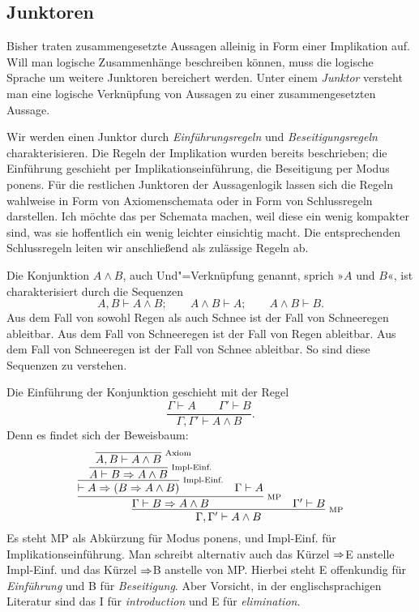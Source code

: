 \subsection{Junktoren}

Bisher traten zusammengesetzte Aussagen alleinig in Form einer
Implikation auf. Will man logische Zusammenhänge beschreiben können,
muss die logische Sprache um weitere Junktoren bereichert werden.
Unter einem \emph{Junktor} versteht man eine logische
Verknüpfung von Aussagen zu einer zusammengesetzten Aussage.

Wir werden einen Junktor durch \emph{Einführungsregeln}%
 und
\emph{Beseitigungsregeln}
charakterisieren. Die Regeln der Implikation
wurden bereits beschrieben; die Einführung geschieht per
Implikationseinführung, die Beseitigung per Modus ponens.
Für die restlichen Junktoren der Aussagenlogik lassen sich die Regeln
wahlweise in Form von Axiomenschemata oder in Form von Schlussregeln
darstellen. Ich möchte das per Schemata machen, weil diese ein wenig
kompakter sind, was sie hoffentlich ein wenig leichter einsichtig macht.
Die entsprechenden Schlussregeln leiten wir anschließend als zulässige
Regeln ab.

Die Konjunktion $A\land B$, auch Und"=Verknüpfung
genannt, sprich »$A$ und $B$«, ist charakterisiert durch die Sequenzen
\[A,B\vdash A\land B;\qquad A\land B\vdash A;\qquad A\land B\vdash B.\]
Aus dem Fall von sowohl Regen als auch Schnee ist der Fall von
Schneeregen ableitbar. Aus dem Fall von Schneeregen ist der Fall
von Regen ableitbar. Aus dem Fall von Schneeregen ist der Fall
von Schnee ableitbar. So sind diese Sequenzen zu verstehen.

Die Einführung der Konjunktion geschieht mit der Regel
\[\dfrac{\Gamma\vdash A\qquad\Gamma'\vdash B}{\Gamma,\Gamma'\vdash A\land B}.\]
Denn es findet sich der Beweisbaum:
\[
\infer[\infernote{MP}]{\Gamma,\Gamma'\vdash A\land B}{
  \infer[\infernote{MP}]{\Gamma\vdash B\cond A\land B}{
    \infer[\infernote{Impl-Einf.}]{\vdash A\cond (B\cond A\land B)}{
      \infer[\infernote{Impl-Einf.}]{A\vdash B\cond A\land B}{
        \infer[\infernote{Axiom}]{A,B\vdash A\land B}{}}}
  & \Gamma\vdash A}
& \Gamma'\vdash B}
\]
Es steht MP als Abkürzung für Modus ponens, und Impl-Einf. für
Implikationseinführung. Man schreibt alternativ auch das Kürzel
$\Rightarrow$E anstelle Impl-Einf. und das Kürzel $\Rightarrow$B anstelle
von MP. Hierbei steht E offenkundig für \emph{Einführung} und
B für \emph{Beseitigung}. Aber Vorsicht, in der englischsprachigen
Literatur sind das I für \emph{introduction} und E für
\emph{elimination}.

